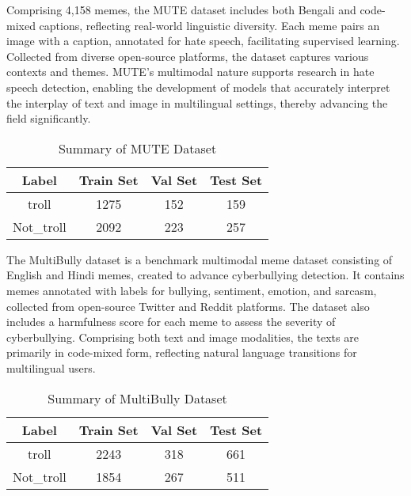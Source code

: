 \documentclass{ieeeaccess}
\begin{document}
Comprising 4,158 memes, the MUTE dataset includes both Bengali and code-mixed captions, reflecting real-world linguistic diversity. Each meme pairs an image with a caption, annotated for hate speech, facilitating supervised learning. Collected from diverse open-source platforms, the dataset captures various contexts and themes. MUTE's multimodal nature supports research in hate speech detection, enabling the development of models that accurately interpret the interplay of text and image in multilingual settings, thereby advancing the field significantly.

\begin{table}[htbp]
\caption{Summary of MUTE Dataset}
\label{tab:mute_dataset}
\centering
\begin{tabular}{|c|c|c|c|}
\hline
\textbf{Label} & \textbf{Train Set} & \textbf{Val Set} & \textbf{Test Set} \\
\hline
troll & 1275 & 152 & 159 \\
Not\_troll & 2092 & 223 & 257 \\
\hline
\end{tabular}
\end{table}

The MultiBully dataset is a benchmark multimodal meme dataset consisting of English and Hindi memes, created to advance cyberbullying detection. It contains memes annotated with labels for bullying, sentiment, emotion, and sarcasm, collected from open-source Twitter and Reddit platforms. The dataset also includes a harmfulness score for each meme to assess the severity of cyberbullying. Comprising both text and image modalities, the texts are primarily in code-mixed form, reflecting natural language transitions for multilingual users.

\begin{table}[htbp]
\caption{Summary of MultiBully Dataset}
\label{tab:multibully_dataset}
\centering
\begin{tabular}{|c|c|c|c|}
\hline
\textbf{Label} & \textbf{Train Set} & \textbf{Val Set} & \textbf{Test Set} \\
\hline
troll & 2243 & 318 & 661 \\
Not\_troll & 1854 & 267 & 511 \\
\hline
\end{tabular}
\end{table}
\end{document}
